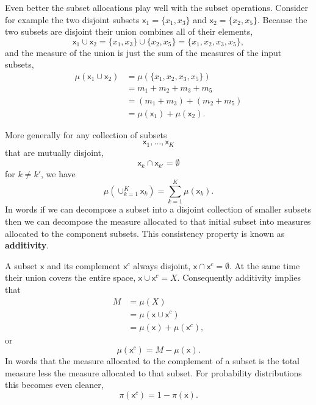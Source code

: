 \documentclass[
  letterpaper,
  DIV=11,
  numbers=noendperiod]{scrartcl}
\begin{document}
Even better the subset allocations play well with the subset operations.
Consider for example the two disjoint subsets
\(\mathsf{x}_{1} = \{ x_{1}, x_{3} \}\) and
\(\mathsf{x}_{2} = \{ x_{2}, x_{5} \}\). Because the two subsets are
disjoint their union combines all of their elements, \[
\mathsf{x}_{1} \cup \mathsf{x}_{2}
=
\{ x_{1}, x_{3} \} \cup \{ x_{2}, x_{5} \}
=
\{ x_{1}, x_{2}, x_{3}, x_{5} \},
\] and the measure of the union is just the sum of the measures of the
input subsets, \begin{align*}
\mu ( \mathsf{x}_{1} \cup \mathsf{x}_{2} )
&=
\mu ( \{ x_{1}, x_{2}, x_{3}, x_{5} \} )
\\
&=
m_{1} + m_{2} + m_{3} + m_{5}
\\
&=
( m_{1} + m_{3} ) + ( m_{2} + m_{5} )
\\
&=
\mu( \mathsf{x}_{1} ) + \mu( \mathsf{x}_{2} ).
\end{align*}

More generally for any collection of subsets \[
\mathsf{x}_{1}, \ldots, \mathsf{x}_{K}
\] that are mutually disjoint, \[
\mathsf{x}_{k} \cap \mathsf{x}_{k'} = \emptyset
\] for \(k \ne k'\), we have \[
\mu ( \cup_{k = 1}^{K} \mathsf{x}_{k} )
=
\sum_{k = 1}^{K} \mu ( \mathsf{x}_{k} ).
\] In words if we can decompose a subset into a disjoint collection of
smaller subsets then we can decompose the measure allocated to that
initial subset into measures allocated to the component subsets. This
consistency property is known as \textbf{additivity}.

A subset \(\mathsf{x}\) and its complement \(\mathsf{x}^{c}\) always
disjoint, \(\mathsf{x} \cap \mathsf{x}^{c} = \emptyset\). At the same
time their union covers the entire space,
\(\mathsf{x} \cup \mathsf{x}^{c} = X\). Consequently additivity implies
that \begin{align*}
M
&=
\mu (X)
\\
&=
\mu ( \mathsf{x} \cup \mathsf{x}^{c} )
\\
&= \mu ( \mathsf{x} ) + \mu ( \mathsf{x}^{c} ),
\end{align*} or \[
\mu ( \mathsf{x}^{c} ) = M - \mu ( \mathsf{x} ).
\] In words that the measure allocated to the complement of a subset is
the total measure less the measure allocated to that subset. For
probability distributions this becomes even cleaner, \[
\pi ( \mathsf{x}^{c} ) = 1 - \pi ( \mathsf{x} ).
\]
\end{document}
